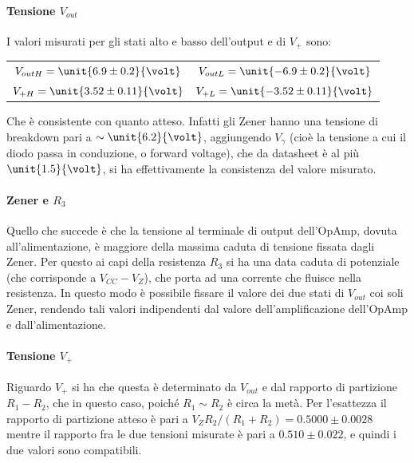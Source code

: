 \documentclass[10pt,a4paper]{article}
\begin{document}
\paragraph{Tensione $V_{out}$} I valori misurati per gli stati alto e basso dell'output e di $V_+$ sono:

\begin{table}[H]
	\centering
	\begin{tabular}{cc}
        $ V_{out H} = \unit{6.9 \pm 0.2}{\volt}$  & $V_{out L} = \unit{-6.9 \pm 0.2}{\volt}$\\
        $ V_{+ H} = \unit{3.52 \pm 0.11}{\volt}$  & $V_{+ L} = \unit{-3.52 \pm 0.11}{\volt}$
	\end{tabular}
\end{table}

Che è consistente con quanto atteso. Infatti gli Zener hanno una tensione di breakdown pari a $\sim \unit{6.2}{\volt}$, aggiungendo $V_\gamma$ (cioè la tensione a cui il diodo passa in conduzione, o forward voltage), che da datasheet è al più $\unit{1.5}{\volt}$, si ha effettivamente la consistenza del valore misurato.

\paragraph{Zener e $R_3$} Quello che succede è che la tensione al terminale di output dell'OpAmp, dovuta all'alimentazione, è maggiore della massima caduta di tensione fissata dagli Zener. Per questo ai capi della resistenza $R_3$ si ha una data caduta di potenziale (che corrisponde a $V_{CC}-V_Z$), che porta ad una corrente che fluisce nella resistenza. In questo modo è possibile fissare il valore dei due stati di $V_{out}$ coi soli Zener, rendendo tali valori indipendenti dal valore dell'amplificazione dell'OpAmp e dall'alimentazione.

\paragraph{Tensione $V_+$} Riguardo $V_+$ si ha che questa è determinato da $V_{out}$ e dal rapporto di partizione $R_1 - R_2$, che in questo caso, poiché $R_1 \sim R_2$ è circa la metà. Per l'esattezza il rapporto di partizione atteso è pari a $V_Z R_2/(R_1 + R_2) = 0.5000 \pm 0.0028$ mentre il rapporto fra le due tensioni misurate è pari a $0.510 \pm 0.022$, e quindi i due valori sono compatibili.
\end{document}

